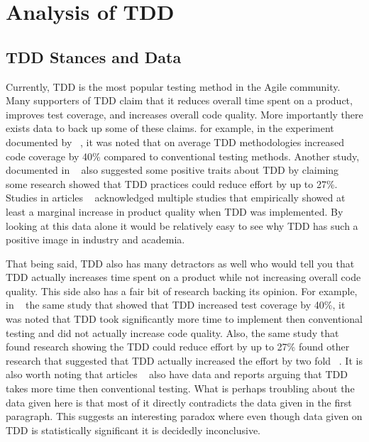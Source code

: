 \documentclass{sig-alternate}
\begin{document}
 

\section{Analysis of TDD}
\subsection{TDD Stances and Data}
Currently, TDD is the most popular testing method in the Agile community.  Many supporters of TDD claim that it reduces overall time spent on a product, improves test coverage, and increases overall code quality.  More importantly there exists data to back up some of these claims.  for example, in the experiment documented by ~\cite{Lemos:2012}, it was noted that on average TDD methodologies increased code coverage by 40\% compared to conventional testing methods.  Another study, documented in ~\cite{Hellman:2012} also suggested some positive traits about TDD by claiming some research showed that TDD practices could reduce effort by up to 27\%. Studies in articles ~\cite{Hellman:2012, Hammond:2012, Kettunen:2010} acknowledged multiple studies that empirically showed at least a marginal increase in product quality when TDD was implemented.  By looking at this data alone it would be relatively easy to see why TDD has such a positive image in industry and academia.

That being said, TDD also has many detractors as well who would tell you that TDD actually increases time spent on a product while not increasing overall code quality. This side also has a fair bit of research backing its opinion.  For example, in ~\cite{Lemos:2012} the same study that showed that TDD increased test coverage by 40\%, it was noted that TDD took significantly more time to implement then conventional testing and did not actually increase code quality. Also, the same study that found research showing the TDD could reduce effort by up to 27\% found other research that suggested that TDD actually increased the effort by two fold ~\cite{Hellman:2012}. It is also worth noting that articles ~\cite{Hammond:2012, Kettunen:2010} also have data and reports arguing that TDD takes more time then conventional testing.  What is perhaps troubling about the data given here is that most of it directly contradicts the data given in the first paragraph.  This suggests an interesting paradox where even though data given on TDD is statistically significant it is decidedly inconclusive. 
\end{document}
